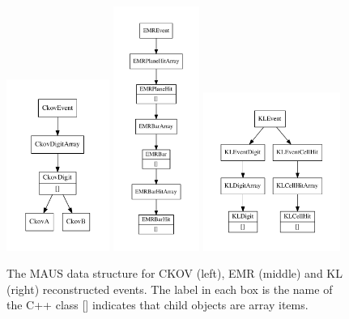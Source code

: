 \documentclass[11pt,a4paper]{article}
\begin{document}
\begin{figure}[ptb]
\centering
\includegraphics[width=0.3\textwidth]{figs/ckov_datastructure.pdf}
\includegraphics[width=0.25\textwidth]{figs/emr_datastructure.pdf}
\includegraphics[width=0.4\textwidth]{figs/kl_datastructure.pdf}
\caption{The MAUS data structure for CKOV (left), EMR (middle) and KL (right) reconstructed events. The label in each box is the name of the C++ class [] indicates that child objects are array items.}
\label{fig:datastructure-recon-ckov-emr-kl}
\end{figure}
\end{document}
